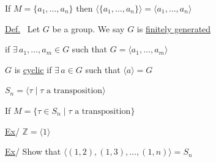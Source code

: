 \documentclass[12pt]{article}
\begin{document}
\bigskip
\noindent If $M=\{a_1,\ldots,a_n\}$ then $\langle\{a_1,\ldots,a_n\}\rangle = \langle a_1,\ldots,a_n\rangle$

\bigskip
\noindent\underline{Def.} \ Let $G$ be a group. We say $G$ is \underline{finitely generated}

\noindent if $\exists\,a_1,\ldots,a_m\in G$ such that $G=\langle a_1,\ldots,a_m\rangle$

\bigskip
\noindent $G$ is \underline{cyclic} if $\exists\,a\in G$ such that $\langle a\rangle=G$

\bigskip
\noindent $S_n = \langle \tau \mid \tau\text{ a transposition}\rangle$

\noindent If $M=\{\tau\in S_n \mid \tau \text{ a transposition}\}$

\bigskip
\noindent\underline{Ex}/ \quad $\mathbb{Z} = \langle 1\rangle$

\bigskip
\noindent\underline{Ex}/ \quad Show that $\big\langle (1,2),(1,3),\ldots,(1,n)\big\rangle = S_n$
\end{document}
